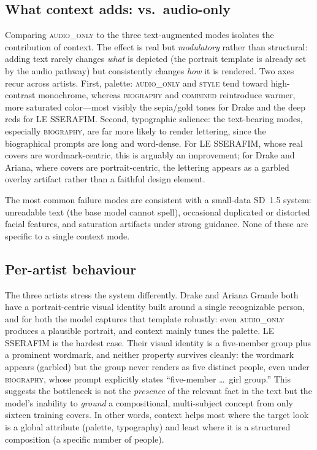 \documentclass{article}
\begin{document}
\subsection{What context adds: vs.\ audio-only}
Comparing \textsc{audio\_only} to the three text-augmented modes isolates the
contribution of context. The effect is real but \emph{modulatory} rather than
structural: adding text rarely changes \emph{what} is depicted (the portrait
template is already set by the audio pathway) but consistently changes
\emph{how} it is rendered. Two axes recur across artists. First, palette:
\textsc{audio\_only} and \textsc{style} tend toward high-contrast monochrome,
whereas \textsc{biography} and \textsc{combined} reintroduce warmer, more
saturated color---most visibly the sepia/gold tones for Drake and the deep reds
for LE SSERAFIM. Second, typographic salience: the text-bearing modes,
especially \textsc{biography}, are far more likely to render lettering, since
the biographical prompts are long and word-dense. For LE SSERAFIM, whose real
covers are wordmark-centric, this is arguably an improvement; for Drake and
Ariana, where covers are portrait-centric, the lettering appears as a garbled
overlay artifact rather than a faithful design element.

The most common failure modes are consistent with a small-data SD~1.5 system:
unreadable text (the base model cannot spell), occasional duplicated or
distorted facial features, and saturation artifacts under strong guidance.
None of these are specific to a single context mode.

\subsection{Per-artist behaviour}
The three artists stress the system differently. Drake and Ariana Grande both
have a portrait-centric visual identity built around a single recognizable
person, and for both the model captures that template robustly: even
\textsc{audio\_only} produces a plausible portrait, and context mainly tunes
the palette. LE SSERAFIM is the hardest case. Their visual identity is a
five-member group plus a prominent wordmark, and neither property survives
cleanly: the wordmark appears (garbled) but the group never renders as five
distinct people, even under \textsc{biography}, whose prompt explicitly states
``five-member \ldots\ girl group.'' This suggests the bottleneck is not the
\emph{presence} of the relevant fact in the text but the model's inability to
\emph{ground} a compositional, multi-subject concept from only sixteen training
covers. In other words, context helps most where the target look is a global
attribute (palette, typography) and least where it is a structured composition
(a specific number of people).
\end{document}
